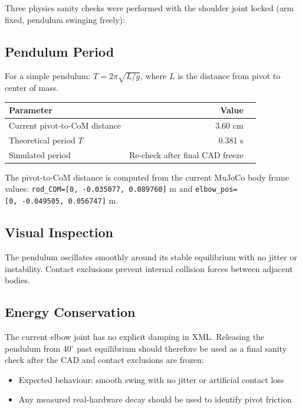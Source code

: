 \documentclass[12pt,a4paper]{article}
\begin{document}
Three physics sanity checks were performed with the shoulder joint locked
(arm fixed, pendulum swinging freely):

\subsection{Pendulum Period}

For a simple pendulum: $T = 2\pi\sqrt{L/g}$, where $L$ is the distance from pivot to center of mass.

\begin{center}
\begin{tabular}{lrr}
\toprule
\textbf{Parameter} & \textbf{Value} \\
\midrule
Current pivot-to-CoM distance & 3.60 cm \\
Theoretical period $T$ & 0.381 s \\
Simulated period & Re-check after final CAD freeze \\
\bottomrule
\end{tabular}
\end{center}

\noindent The pivot-to-CoM distance is computed from the current MuJoCo body
frame values:
\texttt{rod\_COM=[0,\ -0.035077,\ 0.089760]} m and
\texttt{elbow\_pos=[0,\ -0.049505,\ 0.056747]} m.

\subsection{Visual Inspection}

The pendulum oscillates smoothly around its stable equilibrium with no jitter or instability.
Contact exclusions prevent internal collision forces between adjacent bodies.

\subsection{Energy Conservation}

The current elbow joint has no explicit damping in XML.  Releasing the
pendulum from 40$^\circ$ past equilibrium should therefore be used as a
final sanity check after the CAD and contact exclusions are frozen:
\begin{itemize}
    \item Expected behaviour: smooth swing with no jitter or artificial contact loss
    \item Any measured real-hardware decay should be used to identify pivot friction
\end{itemize}
\end{document}
